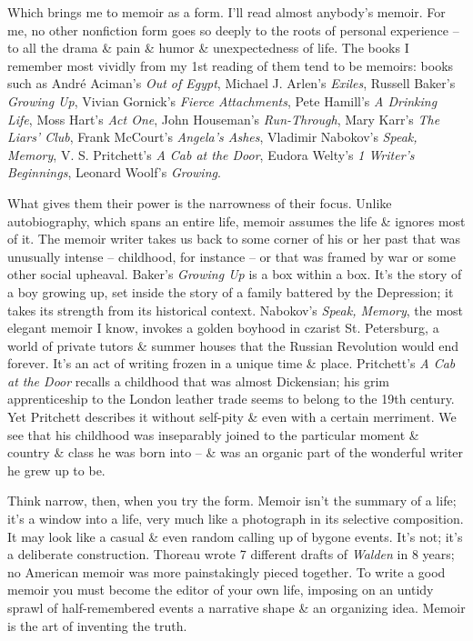 \documentclass{article}
\begin{document}
Which brings me to memoir as a form. I'll read almost anybody's memoir. For me, no other nonfiction form goes so deeply to the roots of personal experience -- to all the drama \& pain \& humor \& unexpectedness of life. The books I remember most vividly from my 1st reading of them tend to be memoirs: books such as Andr\'e Aciman's \textit{Out of Egypt}, Michael J. Arlen's \textit{Exiles}, Russell Baker's \textit{Growing Up}, Vivian Gornick's \textit{Fierce Attachments}, Pete Hamill's \textit{A Drinking Life}, Moss Hart's \textit{Act One}, John Houseman's \textit{Run-Through}, Mary Karr's \textit{The Liars' Club}, Frank McCourt's \textit{Angela's Ashes}, Vladimir Nabokov's \textit{Speak, Memory}, V. S. Pritchett's \textit{A Cab at the Door}, Eudora Welty's \textit{1 Writer's Beginnings}, Leonard Woolf's \textit{Growing}.

What gives them their power is the narrowness of their focus. Unlike autobiography, which spans an entire life, memoir assumes the life \& ignores most of it. The memoir writer takes us back to some corner of his or her past that was unusually intense -- childhood, for instance -- or that was framed by war or some other social upheaval. Baker's \textit{Growing Up} is a box within a box. It's the story of a boy growing up, set inside the story of a family battered by the Depression; it takes its strength from its historical context. Nabokov's \textit{Speak, Memory}, the most elegant memoir I know, invokes a golden boyhood in czarist St. Petersburg, a world of private tutors \& summer houses that the Russian Revolution would end forever. It's an act of writing frozen in a unique time \& place. Pritchett's \textit{A Cab at the Door} recalls a childhood that was almost Dickensian; his grim apprenticeship to the London leather trade seems to belong to the 19th century. Yet Pritchett describes it without self-pity \& even with a certain merriment. We see that his childhood was inseparably joined to the particular moment \& country \& class he was born into -- \& was an organic part of the wonderful writer he grew up to be.

Think narrow, then, when you try the form. Memoir isn't the summary of a life; it's a window into a life, very much like a photograph in its selective composition. It may look like a casual \& even random calling up of bygone events. It's not; it's a deliberate construction. Thoreau wrote 7 different drafts of \textit{Walden} in 8 years; no American memoir was more painstakingly pieced together. To write a good memoir you must become the editor of your own life, imposing on an untidy sprawl of half-remembered events a narrative shape \& an organizing idea. Memoir is the art of inventing the truth.
\end{document}

